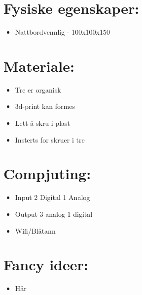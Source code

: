 \documentclass[12pt, a4paper]{article}
\begin{document}
\section {Fysiske egenskaper: }
\begin{itemize}
    \item Nattbordvennlig - 100x100x150
\end{itemize}


\section {Materiale:}
\begin{itemize}
    \item Tre er organisk
    \item 3d-print kan formes
    \item Lett å skru i plast
    \item Insterts for skruer i tre
\end{itemize}

\section {Compjuting:}
\begin{itemize}
    \item Input
2 Digital
1 Analog
    \item Output
3 analog
1 digital
    \item Wifi/Blåtann
\end{itemize}


\section {Fancy ideer: }
\begin{itemize}
    \item Hår
\end{itemize}
\end{document}

